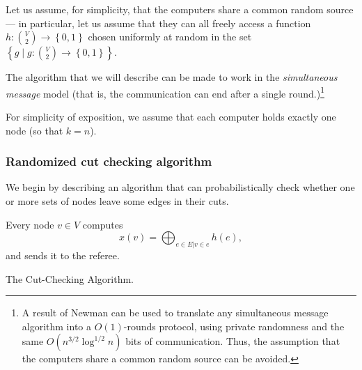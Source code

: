 Let us assume, for simplicity, that the computers share a common random source --- in particular, let us assume that they can all freely access a  function $h: \binom{V}2 \rightarrow \left\{0,1\right\}$ chosen uniformly at random in the set $\left\{g \mid g: \binom{V}2 \rightarrow \left\{0,1\right\}\right\}$.

\smallskip

The algorithm \cite{cks15} that we will describe can be made to work in the {\em simultaneous message} model (that is, the communication can end after a single round.)\footnote{A result of Newman \cite{newman91} can be used to translate any simultaneous message algorithm into a $O(1)$-rounds protocol, using private randomness and the same $O\left(n^{3/2} \log^{1/2} n\right)$ bits of communication. Thus, the assumption that the computers share a common random source can be avoided.}

\smallskip

For simplicity of exposition, we assume that each computer holds exactly one node (so that $k = n$).

\subsubsection{Randomized cut checking algorithm}

We begin by describing an algorithm that can probabilistically check whether one or more sets of nodes leave some edges in their cuts.

\begin{algorithm}
Every node $v \in V$ computes $$x(v) = \bigoplus_{e \in E | v \in e} h(e),$$
and sends it to the referee.
\caption{\label{alg:cutcheck}The Cut-Checking Algorithm.}
\end{algorithm}


